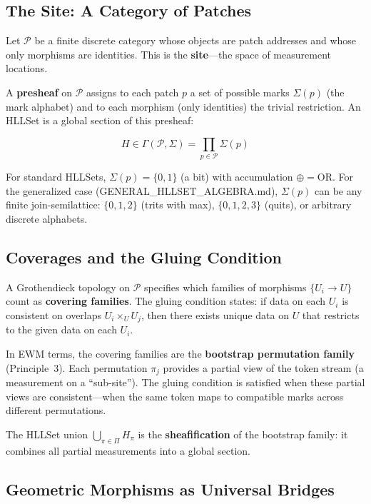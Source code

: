 \documentclass[11pt,a4paper]{article}
\theoremstyle{remark}
\begin{document}
\subsection{The Site: A Category of Patches}

Let $\mathcal{P}$ be a finite discrete category whose objects are patch addresses and
whose only morphisms are identities. This is the \textbf{site}---the space of measurement
locations.

A \textbf{presheaf} on $\mathcal{P}$ assigns to each patch $p$ a set of possible marks
$\Sigma(p)$ (the mark alphabet) and to each morphism (only identities) the trivial
restriction. An HLLSet is a global section of this presheaf:

\begin{equation}
  H \in \Gamma(\mathcal{P}, \Sigma) = \prod_{p \in \mathcal{P}} \Sigma(p)
\end{equation}

For standard HLLSets, $\Sigma(p) = \{0, 1\}$ (a bit) with accumulation $\oplus =
\text{OR}$. For the generalized case (GENERAL\_HLLSET\_ALGEBRA.md), $\Sigma(p)$ can be
any finite join-semilattice: $\{0, 1, 2\}$ (trits with max), $\{0, 1, 2, 3\}$ (quits),
or arbitrary discrete alphabets.

\subsection{Coverages and the Gluing Condition}

A Grothendieck topology on $\mathcal{P}$ specifies which families of morphisms
$\{U_i \to U\}$ count as \textbf{covering families}. The gluing condition states: if
data on each $U_i$ is consistent on overlaps $U_i \times_U U_j$, then there exists
unique data on $U$ that restricts to the given data on each $U_i$.

In EWM terms, the covering families are the \textbf{bootstrap permutation family}
(Principle~3). Each permutation $\pi_j$ provides a partial view of the token stream
(a measurement on a ``sub-site''). The gluing condition is satisfied when these partial
views are consistent---when the same token maps to compatible marks across different
permutations.

The HLLSet union $\bigcup_{\pi \in \Pi} H_\pi$ is the \textbf{sheafification} of the
bootstrap family: it combines all partial measurements into a global section.

\subsection{Geometric Morphisms as Universal Bridges}
\end{document}

